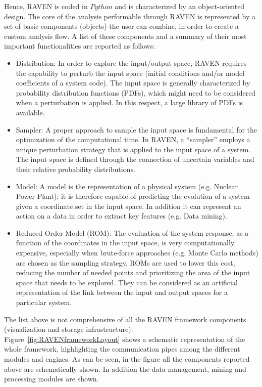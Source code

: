 Hence, RAVEN is coded in $Python$ and is characterized by an object-oriented design. The core of the analysis performable through RAVEN is represented by a set of basic components (objects) the user can combine, in order to create a custom analysis flow. A list of these components and a summary of their most important functionalities are reported as follows:
\begin{itemize}
\item	Distribution: In order to explore the input/output space, RAVEN requires the capability to perturb the input space (initial conditions and/or model coefficients of a system code). The input space is generally characterized by probability distribution functions (PDFs), which might need to be considered when a perturbation is applied. In this respect, a large library of PDFs is available.
\item Sampler: A proper approach to sample the input space is fundamental for the optimization of the computational time. In RAVEN, a ``sampler'' employs a unique perturbation strategy that is applied to the input space of a system. The input space is defined through the connection of uncertain variables and their relative probability distributions.
\item Model: A model is the representation of a physical system (e.g. Nuclear Power Plant); it is therefore capable of predicting the evolution of a system given a coordinate set in the input space. In addition it can represent an
action on a data in order to extract key features (e.g. Data mining).
\item Reduced Order Model (ROM): The evaluation of the system response, as a function of the coordinates in the input space, is very computationally expensive, especially when brute-force approaches (e.g. Monte Carlo methods) are chosen as the sampling strategy. ROMs are used to lower this cost, reducing the number of needed points and prioritizing the area of the input space that needs to be explored. They can be considered as an artificial representation of the link between the input and output spaces for a particular system.
\end{itemize}
The list above is not comprehensive of all the RAVEN framework components (visualization and storage infrastructure).
\\ Figure~\ref{fig:RAVENframeworkLayout} shows a schematic representation of the whole framework, highlighting the communication pipes among the different modules and engines. As can be seen, in the figure all the components reported above are schematically shown. In addition the data management, mining and processing modules are shown.

